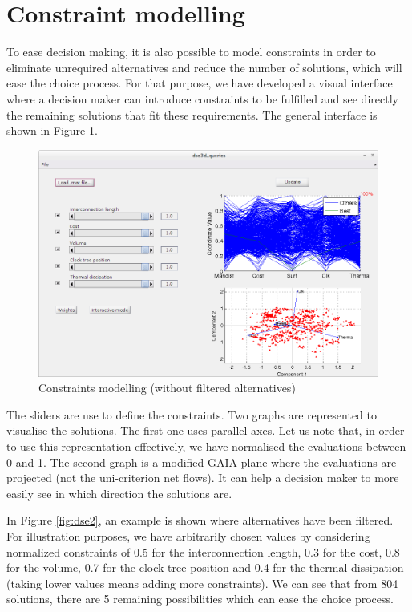 \section{Constraint modelling}
To ease decision making, it is also possible to model constraints in order to eliminate unrequired alternatives and reduce the number of solutions, which will ease the choice process. For that purpose, we have developed a visual interface where a decision maker can introduce constraints to be fulfilled and see directly the remaining solutions that fit these requirements. The general interface is shown in Figure \ref{fig:dse1}.

\begin{figure}[h!]
\begin{center}
\includegraphics[width=\linewidth]{dseconstraints}
\end{center}
\caption{Constraints modelling (without filtered alternatives)}
\label{fig:dse1}
\end{figure}

The sliders are use to define the constraints. Two graphs are represented to visualise the solutions. The first one uses parallel axes. Let us note that, in order to use this representation effectively, we have normalised the evaluations between 0 and 1. The second graph is a modified GAIA plane where the evaluations are projected (not the uni-criterion net flows). It can help a decision maker to more easily see in which direction the solutions are.

In Figure \ref{fig:dse2}, an example is shown where alternatives have been filtered. For illustration purposes, we have arbitrarily chosen values by considering normalized constraints of 0.5 for the interconnection length, 0.3 for the cost, 0.8 for the volume, 0.7 for the clock tree position and 0.4 for the thermal dissipation (taking lower values means adding more constraints). We can see that from 804 solutions, there are 5 remaining possibilities which can ease the choice process.

